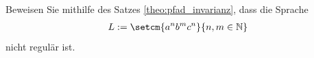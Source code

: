 \begin{myexercise}%
	\noindent
	Beweisen Sie mithilfe des Satzes \cref{theo:pfad_invarianz}, dass die Sprache
	\begin{align}\label{eq:L2}
		L := \setcm{a^n b^m c^n}{n,m\in\mathbb{N}}
	\end{align}
	nicht regulär ist.
\end{myexercise}
